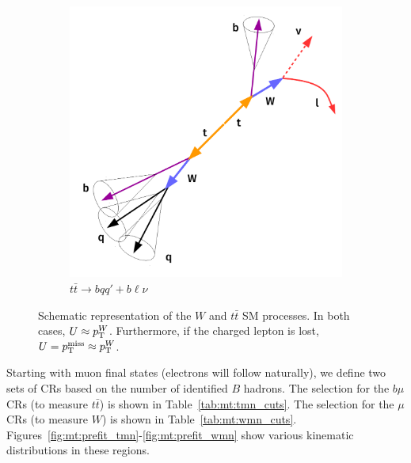 \begin{figure}[]
\begin{center}
\begin{subfigure}[t]{0.49\textwidth}
            \includegraphics[width=\textwidth]{figures/monotop/diagrams/ttcr.pdf}
            \caption{$t\bar{t}\rightarrow bqq'+b\ell\nu$}
        \end{subfigure}
        \caption{Schematic representation of the $W$ and $t\bar{t}$ SM processes.
                 In both cases, $U\approx p_\mathrm{T}^W$.
                 Furthermore, if the charged lepton is lost, $U = p_\mathrm{T}^\mathrm{miss} \approx p_\mathrm{T}^W$.}
        \label{fig:mt:wtt}
    \end{center}
\end{figure}

Starting with muon final states (electrons will follow naturally), we define two sets of CRs based on the number of identified $B$ hadrons.
The selection for the $b\mu$ CRs (to measure $t\bar{t}$) is shown in Table~\ref{tab:mt:tmn_cuts}.
The selection for the $\mu$ CRs (to measure $W$) is shown in Table~\ref{tab:mt:wmn_cuts}.
Figures~\ref{fig:mt:prefit_tmn}-\ref{fig:mt:prefit_wmn} show various kinematic distributions in these regions.

